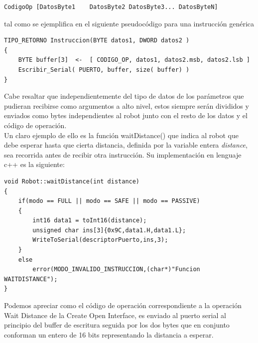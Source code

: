 \documentclass[letterpaper,openright,12pt]{book}
\begin{document}
\begin{lstlisting}
CodigoOp [DatosByte1	DatosByte2 DatosByte3... DatosByteN]
\end{lstlisting}
tal como se ejemplifica en el siguiente pseudocódigo para una instrucción genérica

\begin{lstlisting}
TIPO_RETORNO Instruccion(BYTE datos1, DWORD datos2 )
{
	BYTE buffer[3]  <-  [ CODIGO_OP, datos1, datos2.msb, datos2.lsb ]
	Escribir_Serial( PUERTO, buffer, size( buffer) )
}

\end{lstlisting}
Cabe resaltar que independientemente del tipo de datos de los parámetros que pudieran recibirse como argumentos a alto nivel, estos siempre serán divididos y enviados como bytes independientes al robot junto con el resto de los datos y el código de operación.\\
Un claro ejemplo de ello es la función  waitDistance() que indica al robot que debe esperar hasta que cierta distancia, definida por la variable entera \emph{distance}, sea recorrida antes de recibir otra instrucción. Su implementación en lenguaje c++ es la siguiente:\\
\begin{lstlisting}
void Robot::waitDistance(int distance)
{
	if(modo == FULL || modo == SAFE || modo == PASSIVE)
	{
		int16 data1 = toInt16(distance);
		unsigned char ins[3]{0x9C,data1.H,data1.L};
		WriteToSerial(descriptorPuerto,ins,3);
	}
	else
		error(MODO_INVALIDO_INSTRUCCION,(char*)"Funcion WAITDISTANCE");
}

\end{lstlisting}
Podemos apreciar como el código de operación correspondiente a la operación Wait Distance de la Create Open Interface, es enviado al puerto serial al principio del buffer de escritura seguida por los dos bytes que en conjunto conforman un entero de 16 bits representando la distancia a esperar.\\
\end{document}
